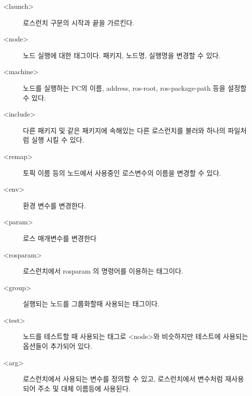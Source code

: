 \begin{description}
\item[\textless launch\textgreater] 로스런치 구문의 시작과 끝을 가르킨다.
\item[\textless node\textgreater] 노드 실행에 대한 태그이다. 패키지, 노드명, 실행명을 변경할 수 있다.
\item[\textless machine\textgreater] 노드를 실행하는 PC의 이름, address,  ros-root,  ros-package-path 등을 설정할 수 있다.
\item[\textless include\textgreater] 다른 패키지 및 같은 패키지에 속해있는 다른 로스런치를 불러와 하나의 파일처럼 실행 시킬 수 있다.
\item[\textless remap\textgreater] 토픽 이름 등의 노드에서 사용중인 로스변수의 이름을 변경할 수 있다. 
\item[\textless env\textgreater] 환경 변수를 변경한다.
\item[\textless param\textgreater] 로스 매개변수를 변경한다
\item[\textless rosparam\textgreater] 로스런치에서 rosparam 의 명령어를 이용하는 태그이다.
\item[\textless group\textgreater] 실행되는 노드를 그룹화할때 사용되는 태그이다.
\item[\textless test\textgreater] 노드를 테스트할 때 사용되는 태그로 \textless node\textgreater 와 비슷하지만 테스트에 사용되는 옵션들이 추가되어 있다.
\item[\textless arg\textgreater] 로스런치에서 사용되는 변수를 정의할 수 있고, 로스런치에서 변수처럼 재사용되어 주소 및 대체 이름등에 사용된다.
\end{description}

